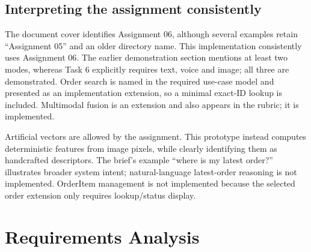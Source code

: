 \documentclass[11pt,a4paper]{article}
\begin{document}
\subsection{Interpreting the assignment consistently}
The document cover identifies Assignment 06, although several examples retain ``Assignment 05'' and an older directory name. This implementation consistently uses Assignment 06. The earlier demonstration section mentions at least two modes, whereas Task 6 explicitly requires text, voice and image; all three are demonstrated. Order search is named in the required use-case model and presented as an implementation extension, so a minimal exact-ID lookup is included. Multimodal fusion is an extension and also appears in the rubric; it is implemented.

Artificial vectors are allowed by the assignment. This prototype instead computes deterministic features from image pixels, while clearly identifying them as handcrafted descriptors. The brief's example ``where is my latest order?'' illustrates broader system intent; natural-language latest-order reasoning is not implemented. OrderItem management is not implemented because the selected order extension only requires lookup/status display.

\section{Requirements Analysis}\label{sec:requirements}
\end{document}
